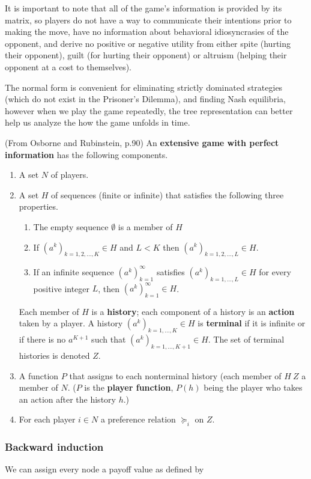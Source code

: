It is important to note that all of the game's information is provided by its matrix, so players do not have a way to communicate their intentions prior to making the move, have no information about behavioral idiosyncrasies of the opponent, and derive no positive or negative utility from either spite (hurting their opponent), guilt (for hurting their opponent) or altruism (helping their opponent at a cost to themselves).

The normal form is convenient for eliminating strictly dominated strategies (which do not exist in the Prisoner's Dilemma), and finding Nash equilibria, however when we play the game repeatedly, the tree representation can better help us analyze the how the game unfolds in time.

\begin{definition} (From Osborne and Rubinstein, p.90) An \textbf{extensive game with perfect information} has the following components.
\begin{enumerate}
\item A set $N$ of players.
\item A set $H$ of sequences (finite or infinite) that satisfies the following three properties.
	\begin{enumerate}
	\item The empty sequence $\emptyset$ is a member of $H$
	\item If $(a^k)_{k=1,2,\dots,K} \in H$ and $L < K$ then $(a^k)_{k=1,2,\dots,L} \in H$.
	\item If an infinite sequence $(a^k)_{k=1}^\infty$ satisfies $(a^k)_{k=1,\dots,L} \in H$ for every positive integer $L$, then $(a^k)_{k=1}^\infty \in H$.
	\end{enumerate}
	Each member of $H$ is a \textbf{history}; each component of a history is an \textbf{action} taken by a player. A history $(a^k)_{k=1,\dots,K} \in H$ is \textbf{terminal} if it is infinite or if there is no $a^{K+1}$ such that $(a^k)_{k=1,\dots,K+1} \in H$. The set of terminal histories is denoted $Z$.
\item A function $P$ that assigns to each nonterminal history (each member of $H \ Z$ a member of $N$. ($P$ is the \textbf{player function}, $P(h)$ being the player who takes an action after the history $h$.)
\item For each player $i \in N$ a preference relation $\succeq_i$ on $Z$.
\end{enumerate}
\end{definition}

\subsubsection {Backward induction}
We can assign every node a payoff value as defined by 


